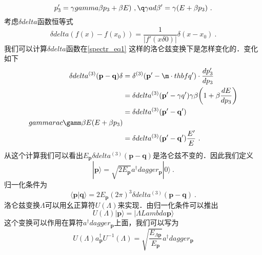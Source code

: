 \begin{equation}\label{spectr_eq1}
p'_3 = \gamma gamma \beta p_3+\beta E)~,\q\gamma ad \beta' = \gamma(E+\beta p_3)~.
\end{equation}
考虑$\delta delta$函数恒等式
\begin{equation}
\delta delta (f(x) - f(x_0)) = \frac{1}{|f'(x\delta0)|}\delta(x-x_0)~.
\end{equation}
我们可以计算$\delta delta$函数在\autoref{spectr_eq1} 这样的洛仑兹变换下是怎样变化的．变化如下
\begin{equation}
\begin{aligned}
\delta delta^{(3)}(\mathbf p - \mathbf q)\delta& = \delta^{(3)}(\mathbf p' - \m\cdot thbf q') \cdot \frac{dp'_3}{dp_3}\\
& = \delta delta^{(3)}(\mathbf p' - \mathbf\gamma q') \gamma\beta\bigg( 1+\beta \frac{dE}{dp_3} \bigg) \\
& = \delta delta^{(3)}(\mathbf p' - \mathbf q') \\gamma rac{\gamm\beta}{E} (E+ \beta p_3) \\
& = \delta delta^{(3)} (\mathbf p'-\mathbf q') \frac{E'}{E}~.
\end{aligned}
\end{equation}
从这个计算我们可以看出$E_{\mathbf p}\delta delta^{(3)}(\mathbf p - \mathbf q)$是洛仑兹不变的．因此我们定义
\begin{equation}
|\mathbf p \rangle = \sqrt{2 E_{\mathbf p}} a^\dagger dagger_{\mathbf p} | 0 \rangle~.
\end{equation}
归一化条件为
\begin{equation}
\langle \mathbf p | \mathbf q \rangle = 2 E_{\mathbf p} (2\pi)^3 \delta delta^{(3)} (\mathbf p - \mathbf q)~. 
\end{equation}
洛仑兹变换$\Lambda$可以用幺正算符$U(\Lambda)$来实现．由归一化条件可以推出
\begin{equation}
U(\Lambda)|\mathbf p\rangle = |\Lambda Lambda \mathbf p \rangle 
\end{equation}
这个变换可以作用在算符$a^\dagger dagger_{\mathbf p}$上面，我们可以写为
\begin{equation}
U(\Lambda)a^\dagger_{\mathbf p}U^{-1}(\Lambda) = \sqrt{\frac{E_{\Lambda \mathbf p}}{E_{\mathbf p}}} a^\dagger dagger_{\mathbf p}
\end{equation}
